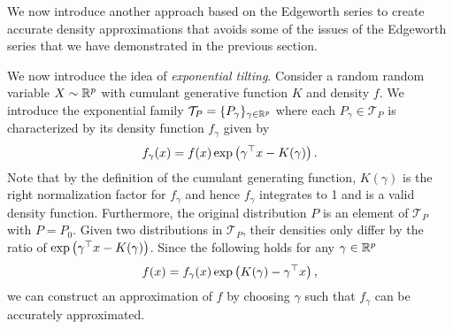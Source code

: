 We now introduce another approach based on the Edgeworth series to create accurate density approximations that avoids some of the issues of the Edgeworth series that we have demonstrated in the previous section.

We now introduce the idea of \textit{exponential tilting}. Consider a random random variable $X \sim {\mathbb{R}^p}$ with cumulant generative function $K$ and density $f$. We introduce the exponential family $\mathcal{T}_P = \{ P_\gamma \}_{\gamma \in {\mathbb{R}^p}}$ where each $P_\gamma \in \mathcal{T}_P$ is characterized by its density function $f_\gamma$ given by
\begin{equation*}
    f_\gamma(x) = f(x)\exp\left(\gamma^\top x - K(\gamma)\right).
\end{equation*}
Note that by the definition of the cumulant generating function, $K(\gamma)$ is the right normalization factor for $f_\gamma$ and hence $f_\gamma$ integrates to 1 and is a valid density function. Furthermore, the original distribution $P$ is an element of $\mathcal{T}_P$ with $P = P_0$. Given two distributions in $\mathcal{T}_P$, their densities only differ by the ratio of $\exp\left(\gamma^\top x - K(\gamma)\right)$. Since the following holds for any $\gamma \in {\mathbb{R}^p}$
\begin{equation} \label{eq-saddlepoint-original}
    f(x) = f_\gamma(x)\exp\left(K(\gamma) - \gamma^\top x\right),
\end{equation}
we can construct an approximation of $f$ by choosing $\gamma$ such that $f_\gamma$ can be accurately approximated.


